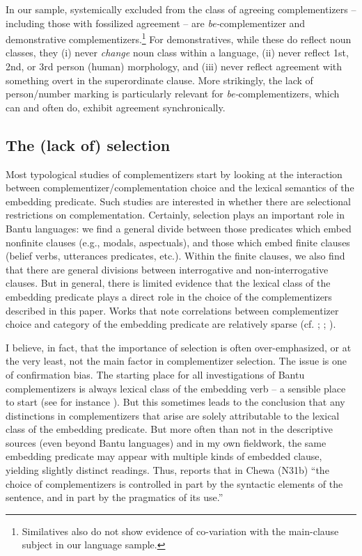 \documentclass[output=paper,colorlinks,citecolor=brown,
]{langscibook}
\begin{document}
 In our sample, systemically excluded from the class of agreeing complementizers -- including those with fossilized agreement -- are \textit{be-}complementizer and demonstrative complementizers.\footnote{Similatives  also do not show evidence of co-variation with the main-clause subject in our language sample.}  For demonstratives, while these do reflect noun classes, they (i) never \textit{change} noun class within a language, (ii) never reflect 1st, 2nd, or 3rd person (human) morphology, and (iii) never reflect agreement with something overt in the superordinate clause. More strikingly, the lack of person/number marking is particularly relevant for \textit{be-}complementizers, which can and often do, exhibit agreement synchronically. 
 

\subsection{The (lack of) selection}


Most typological studies of complementizers start by looking at the interaction between complementizer/complementation choice and the lexical semantics of the embedding predicate. Such studies are interested in whether there are selectional restrictions on complementation. Certainly, selection plays an important role in Bantu languages:  we find a general divide between those predicates which embed nonfinite clauses (e.g., modals, aspectuals), and those which embed finite clauses (belief verbs, utterances predicates, etc.). Within the finite clauses, we also find that there are general divisions between interrogative and non-interrogative clauses. But in general, there is limited evidence that the lexical class of the embedding predicate plays a direct role in the choice of the complementizers described in this paper. Works that note correlations between complementizer choice and category of the embedding predicate are relatively sparse (cf. \citealt{GivonKimenyi:1974}; \citealt{VandeVelde:2008}; \citealt{FinholtGluckman:2023}).


I believe, in fact, that the importance of selection is often over-emphasized, or at the very least, not the main factor in complementizer selection. The issue is one of confirmation bias. The starting place for all investigations of Bantu complementizers is always lexical class of the embedding verb -- a sensible place to start (see for instance \citealt{Safir:2008}). But this sometimes leads to the conclusion that any distinctions in complementizers that arise are  solely attributable to the lexical class of the embedding predicate. But more often than not in the descriptive sources (even beyond Bantu languages) and in my own fieldwork, the same embedding predicate may appear with multiple kinds of embedded clause, yielding slightly distinct readings. Thus, \citet[189]{Myers:1975} reports that in Chewa  (N31b) ``the choice of complementizers is controlled in part by the syntactic elements of the sentence, and in part by the pragmatics of its use.''
\end{document}
